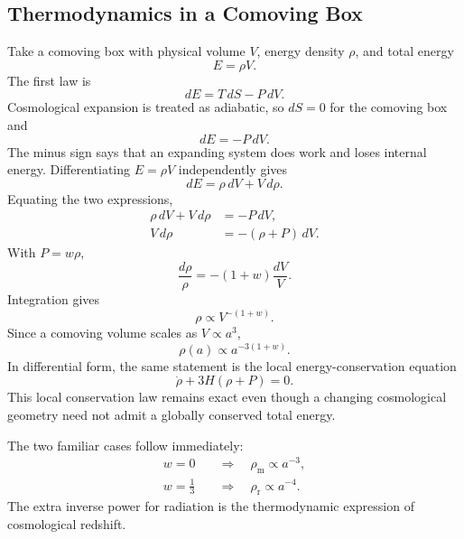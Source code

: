 \subsection{Thermodynamics in a Comoving Box}

Take a comoving box with physical volume \(V\), energy density \(\rho\), and total energy
\begin{equation}
E=\rho V.
\end{equation}
The first law is
\begin{equation}
dE=T\,dS-P\,dV.
\end{equation}
Cosmological expansion is treated as adiabatic, so \(dS=0\) for the comoving box and
\begin{equation}
dE=-P\,dV.
\label{eq:c04-adiabatic-first-law}
\end{equation}
The minus sign says that an expanding system does work and loses internal energy. Differentiating \(E=\rho V\) independently gives
\begin{equation}
dE=\rho\,dV+V\,d\rho.
\end{equation}
Equating the two expressions,
\begin{align}
\rho\,dV+V\,d\rho&=-P\,dV,\\
V\,d\rho&=-(\rho+P)\,dV.
\label{eq:c04-volume-continuity}
\end{align}
With \(P=w\rho\),
\begin{equation}
\frac{d\rho}{\rho}=-(1+w)\frac{dV}{V}.
\end{equation}
Integration gives
\begin{equation}
\rho\propto V^{-(1+w)}.
\end{equation}
Since a comoving volume scales as \(V\propto a^3\),
\begin{equation}
\boxed{\rho(a)\propto a^{-3(1+w)}}.
\label{eq:c04-density-scaling}
\end{equation}
In differential form, the same statement is the local energy-conservation equation
\begin{equation}
\dot\rho+3H(\rho+P)=0.
\label{eq:c04-continuity}
\end{equation}
This local conservation law remains exact even though a changing cosmological geometry need not admit a globally conserved total energy.

The two familiar cases follow immediately:
\begin{align}
w=0
&\quad\Longrightarrow\quad
\rho_{\mathrm m}\propto a^{-3},\\
w=\frac13
&\quad\Longrightarrow\quad
\rho_{\mathrm r}\propto a^{-4}.
\end{align}
The extra inverse power for radiation is the thermodynamic expression of cosmological redshift.

